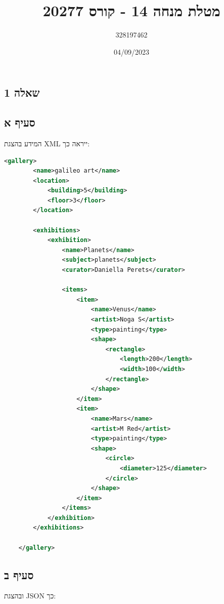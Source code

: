 \documentclass{article}
\title{מטלת מנחה 14 - קורס 20277}
\author{328197462}
\date{04/09/2023}
\begin{document}
\begin{hebrew}
    \maketitle
    \section*{שאלה 1}

    \subsection*{סעיף א}
    המידע בהצגת XML ייראה כך:
\end{hebrew}

\begin{lstlisting}[language=XML]
        <gallery>
        <name>galileo art</name>
        <location>
            <building>5</building>
            <floor>3</floor>
        </location>
    
        <exhibitions>
            <exhibition>
                <name>Planets</name>
                <subject>planets</subject>
                <curator>Daniella Perets</curator>
    
                <items>
                    <item>
                        <name>Venus</name>
                        <artist>Noga S</artist>
                        <type>painting</type>
                        <shape>
                            <rectangle>
                                <length>200</length>
                                <width>100</width>
                            </rectangle>
                        </shape>
                    </item>
                    <item>
                        <name>Mars</name>
                        <artist>M Red</artist>
                        <type>painting</type>
                        <shape>
                            <circle>
                                <diameter>125</diameter>
                            </circle>
                        </shape>
                    </item>
                </items>
            </exhibition>
        </exhibitions>
    
    </gallery>
\end{lstlisting}

\pagebreak

\begin{hebrew}
    \subsection*{סעיף ב}
    ובהצגת JSON כך:
\end{hebrew}
\end{document}

